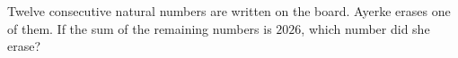 Twelve consecutive natural numbers are written on the board. Ayerke erases one of them. If the sum of the remaining numbers is $2026$, which number did she erase?

